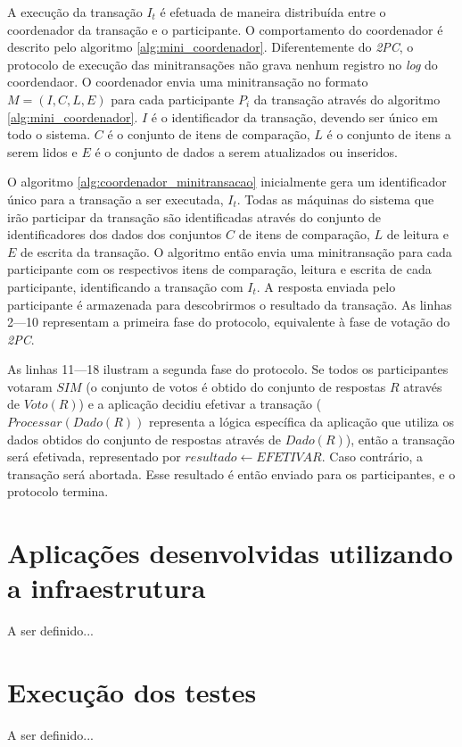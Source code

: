 \documentclass[11pt,twoside,a4paper]{book}
\begin{document}
A execução da transação \(I_t\) é efetuada de maneira distribuída entre o coordenador da transação e o participante. O comportamento do coordenador é descrito pelo algoritmo \ref{alg:mini_coordenador}. Diferentemente do \emph{2PC}, o protocolo de execução das minitransações não grava nenhum registro no \emph{log} do coordendaor. O coordenador envia uma minitransação no formato \(M = (I, C, L, E)\) para cada participante \(P_i\) da transação através do algoritmo \ref{alg:mini_coordenador}. $I$ é o identificador da transação, devendo ser único em todo o sistema. $C$ é o conjunto de itens de comparação, $L$ é o conjunto de itens a serem lidos e $E$ é o conjunto de dados a serem atualizados ou inseridos.

O algoritmo \ref{alg:coordenador_minitransacao} inicialmente gera um identificador único para a transação a ser executada, $I_t$. Todas as máquinas do sistema que irão participar da transação são identificadas através do conjunto de identificadores dos dados dos conjuntos $C$ de itens de comparação, $L$ de leitura e $E$ de escrita da transação. O algoritmo então envia uma minitransação para cada participante com os respectivos itens de comparação, leitura e escrita de cada participante, identificando a transação com $I_t$. A resposta enviada pelo participante é armazenada para descobrirmos o resultado da transação. As linhas 2---10 representam a primeira fase do protocolo, equivalente à fase de votação do \emph{2PC}.

As linhas 11---18 ilustram a segunda fase do protocolo. Se todos os participantes votaram $SIM$ (o conjunto de votos é obtido do conjunto de respostas $R$ através de $Voto(R)$) e a aplicação decidiu efetivar a transação ($Processar(Dado(R))$ representa a lógica específica da aplicação que utiliza os dados obtidos do conjunto de respostas através de $Dado(R)$), então a transação será efetivada, representado por $resultado \gets EFETIVAR$. Caso contrário, a transação será abortada. Esse resultado é então enviado para os participantes, e o protocolo termina.

\section{Aplicações desenvolvidas utilizando a infraestrutura}
\label{sec:aplicacoes}
A ser definido...

\section{Execução dos testes}
\label{sec:testes}
A ser definido...
\end{document}
